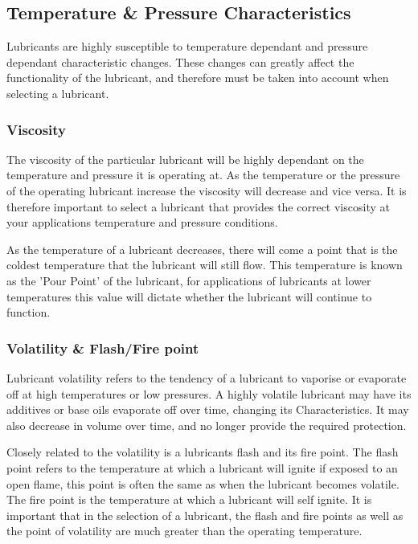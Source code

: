 \documentclass[a4paper,11pt]{article}
\begin{document}
\subsection{Temperature \& Pressure Characteristics}

Lubricants are highly susceptible to temperature dependant and pressure dependant characteristic changes. These changes can greatly affect the functionality of the lubricant, and therefore must be taken into account when selecting a lubricant.


\subsubsection{Viscosity}

The viscosity of the particular lubricant will be highly dependant on the temperature and pressure it is operating at. As the temperature or the pressure of the operating lubricant increase the viscosity will decrease and vice versa. It is therefore important to select a lubricant that provides the correct viscosity at your applications temperature and pressure conditions. 

As the temperature of a lubricant decreases, there will come a point that is the coldest temperature that the lubricant will still flow. This temperature is known as the 'Pour Point' of the lubricant, for applications of lubricants at lower temperatures this value will dictate whether the lubricant will continue to function. 

\subsubsection{Volatility \& Flash/Fire point}

Lubricant volatility refers to the tendency of a lubricant to vaporise or evaporate off at high temperatures or low pressures. A highly volatile lubricant may have its additives or base oils evaporate off over time, changing its Characteristics. It may also decrease in volume over time, and no longer provide the required protection. 

Closely related to the volatility is a lubricants flash and its fire point. The flash point refers to the temperature at which a lubricant will ignite if exposed to an open flame, this point is often the same as when the lubricant becomes volatile. The fire point is the temperature at which a lubricant will self ignite. It is important that in the selection of a lubricant, the flash and fire points as well as the point of volatility are much greater than the operating temperature. 
\end{document}
